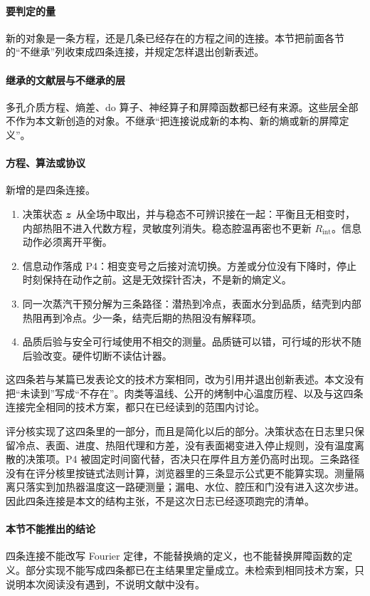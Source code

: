 \paragraph{要判定的量}
新的对象是一条方程，还是几条已经存在的方程之间的连接。本节把前面各节的“不继承”列收束成四条连接，并规定怎样退出创新表述。

\paragraph{继承的文献层与不继承的层}
多孔介质方程、熵差、$\mathrm{do}$ 算子、神经算子和屏障函数都已经有来源\cite{whitaker1977,lindley1956,pearl2009,li2021fno,lu2021deeponet,ames2017cbf}。这些层全部不作为本文新创造的对象。不继承“把连接说成新的本构、新的熵或新的屏障定义”。

\paragraph{方程、算法或协议}
新增的是四条连接。

\begin{enumerate}
\item 决策状态 $\bm{z}$ 从全场中取出，并与稳态不可辨识接在一起：平衡且无相变时，内部热阻不进入代数方程，灵敏度列消失。稳态腔温再密也不更新 $R_{\mathrm{int}}$。信息动作必须离开平衡。
\item 信息动作落成 P4：相变变号之后接对流切换。方差或分位没有下降时，停止时刻保持在动作之前。这是无效探针否决，不是新的熵定义。
\item 同一次蒸汽干预分解为三条路径：潜热到冷点，表面水分到品质，结壳到内部热阻再到冷点。少一条，结壳后期的热阻没有解释项。
\item 品质后验与安全可行域使用不相交的测量。品质链可以错，可行域的形状不随后验改变。硬件切断不读估计器。
\end{enumerate}

这四条若与某篇已发表论文的技术方案相同，改为引用并退出创新表述。本文没有把“未读到”写成“不存在”。肉类等温线、公开的烤制中心温度历程、以及与这四条连接完全相同的技术方案，都只在已经读到的范围内讨论。

评分核实现了这四条里的一部分，而且是简化以后的部分。决策状态在日志里只保留冷点、表面、进度、热阻代理和方差，没有表面褐变进入停止规则，没有温度离散的决策项。P4 被固定时间窗代替，否决只在厚件且方差仍高时出现。三条路径没有在评分核里按链式法则计算，浏览器里的三条显示公式更不能算实现。测量隔离只落实到加热器温度这一路硬测量；漏电、水位、腔压和门没有进入这次步进。因此四条连接是本文的结构主张，不是这次日志已经逐项跑完的清单。

\paragraph{本节不能推出的结论}
四条连接不能改写 Fourier 定律，不能替换熵的定义，也不能替换屏障函数的定义。部分实现不能写成四条都已在主结果里定量成立。未检索到相同技术方案，只说明本次阅读没有遇到，不说明文献中没有。
